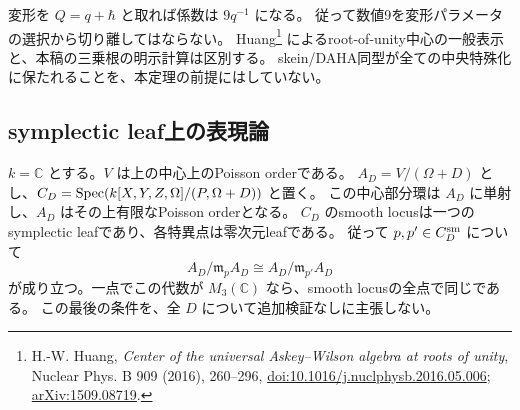 \begin{remark}[規約と先行研究]
変形を $Q=q+\hbar$ と取れば係数は $9q^{-1}$ になる。
従って数値9を変形パラメータの選択から切り離してはならない。
Huang\footnote{H.-W. Huang, \emph{Center of the universal Askey--Wilson algebra
at roots of unity}, Nuclear Phys. B 909 (2016), 260--296,
\href{https://doi.org/10.1016/j.nuclphysb.2016.05.006}{doi:10.1016/j.nuclphysb.2016.05.006};
\href{https://arxiv.org/abs/1509.08719}{arXiv:1509.08719}.}
によるroot-of-unity中心の一般表示と、本稿の三乗根の明示計算は区別する。
skein/DAHA同型が全ての中央特殊化に保たれることを、本定理の前提にはしていない。
\end{remark}

\subsection{symplectic leaf上の表現論}
\begin{corollary}
\label{cor:root-poisson-fibers}
$k=\mathbb C$ とする。$V$ は上の中心上のPoisson orderである。
$A_D=V/(\Omega+D)$ とし、$C_D=\operatorname{Spec}(k[X,Y,Z,\Omega]/(P,\Omega+D))$ と置く。
この中心部分環は $A_D$ に単射し、$A_D$ はその上有限なPoisson orderとなる。
$C_D$ のsmooth locusは一つのsymplectic leafであり、各特異点は零次元leafである。
従って $p,p'\in C_D^{\rm sm}$ について
\[
 A_D/\mathfrak m_pA_D\cong A_D/\mathfrak m_{p'}A_D
\]
が成り立つ。一点でこの代数が $M_3(\mathbb C)$ なら、smooth locusの全点で同じである。
この最後の条件を、全 $D$ について追加検証なしに主張しない。
\end{corollary}
